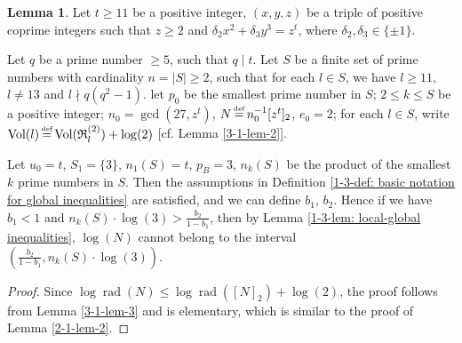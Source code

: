 \documentclass[a4paper, 12pt]{article}
\DeclareMathOperator{\defeq}{\overset{\text{\tiny{def}}}{=}}
\DeclareMathOperator{\rad}{\text{rad}}
\DeclareMathOperator{\Vol}{\text{Vol}}
\numberwithin{equation}{section}
\theoremstyle{definition}
\newtheorem{lem}[thm]{Lemma}
\begin{document}
\begin{lem}  \label{3-1-lem-4}
Let $t\ge 11$ be a positive integer, $(x,y,z)$ be a triple of positive coprime integers such that $z\ge 2$ and $\delta_2 x^2 + \delta_3 y^3 = z^t$, where $\delta_2,\delta_3 \in \{\pm 1\}$.

Let $q$ be a prime number $\ge 5$, such that $q\mid t$. 
Let $S$ be a finite set of prime numbers with cardinality $n = |S| \ge 2$, such that for each $l\in S$, we have $l \ge 11$, $l\neq 13$ and $l\nmid q(q^2-1)$.
let $p_0$ be the smallest prime number in $S$; $2\le k\le S$ be a positive integer; $n_0 = \gcd(27, z^t)$, $N \defeq n_0^{-1} [z^t]_2$, $e_0 = 2$;
for each $l\in S$, write $\Vol(l)\defeq \Vol(\mathfrak R_l^{(2)})+\log(2)$ [cf. Lemma \ref{3-1-lem-2}].

Let $u_0 = t$, $S_1 = \{3\}$, $n_1(S) = t$, $p_B = 3$, $n_k(S)$ be the product of the smallest $k$ prime numbers in $S$.
Then the assumptions in Definition \ref{1-3-def: basic notation for global inequalities} are satisfied, and we can define $b_1$, $b_2$. 
Hence if we have $b_1 <  1$ and $n_k(S)\cdot \log(3) > \frac{b_2}{1-b_1}$, then by Lemma \ref{1-3-lem: local-global inequalities}, $\log(N)$ cannot belong to the interval $(\frac{b_2}{1-b_1}, n_k(S)\cdot \log(3) ) .$
\end{lem}
\begin{proof}
Since $\log\rad(N) \le \log\rad([N]_2) + \log(2)$, the proof follows from Lemma \ref{3-1-lem-3} and is elementary, which is similar to the proof of Lemma \ref{2-1-lem-2}.
\end{proof}
\end{document}
